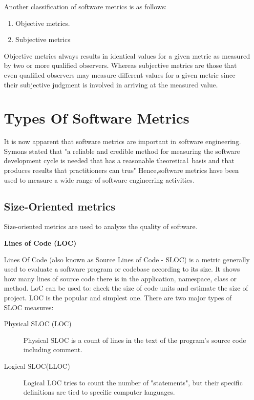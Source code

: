 Another classification of software metrics is as follows:

\begin{enumerate}
	\item Objective metrics.
	\item Subjective metrics
\end{enumerate}

Objective metrics always results in identical values for a given metric as measured by two or more qualified observers. Whereas subjective metrics are those that even qualified observers may measure different values for a given metric since their subjective judgment is involved in arriving at the measured value.

\section{Types Of Software Metrics}

It is now apparent that software metrics are important in software
engineering. Symons stated that "a reliable and credible method
for measuring the software development cycle is needed that has a reasonable
theoretica1 basis and that produces results that practitioners can trus" Hence,software metrics have been used to measure a wide range of software
engineering activities.

\subsection{Size-Oriented metrics}

Size-oriented metrics are used to analyze the quality of software.

\textbf{Lines of Code (LOC)}

Lines Of Code (also known as Source Lines of Code - SLOC) is a metric generally used to
evaluate a software program or codebase according to its size. It shows how many lines of source
code there is in the application, namespace, class or method. LoC can be used to: check the size
of code units and estimate the size of project. LOC is the popular and simplest one.
There are two major types of SLOC measures: 

\begin{description}
	\item[Physical SLOC (LOC)] Physical SLOC is a count of lines in the text of the program's source code including comment.
	\item[Logical SLOC(LLOC)] Logical LOC tries to count the number of "statements", but their specific definitions are tied to specific computer languages.
\end{description}

